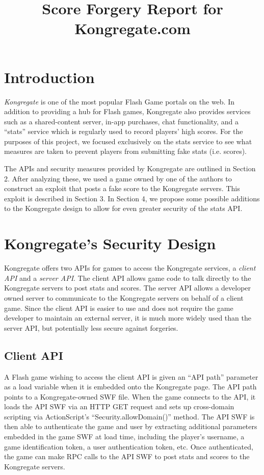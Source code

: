 \documentclass [11pt] {article}
\begin{document}
\title { Score Forgery Report for Kongregate.com}

\maketitle

\section { Introduction }

\emph{Kongregate} is one of the most popular Flash Game portals on the web. In addition to providing a hub for Flash games, Kongregate also provides services such as a shared-content server, in-app purchases, chat functionality, and a ``stats'' service which is regularly used to record players' high scores. For the purposes of this project, we focused exclusively on the stats service to see what measures are taken to prevent players from submitting fake stats (i.e. scores). 

The APIs and security measures provided by Kongregate are outlined in Section 2. After analyzing these, we used a game owned by one of the authors to construct an exploit that posts a fake score to the Kongregate servers. This exploit is described in Section 3. In Section 4, we propose some possible additions to the Kongregate design to allow for even greater security of the stats API. 

\section { Kongregate's Security Design }

Kongregate offers two APIs for games to access the Kongregate services, a \emph{client API} and a \emph{server API}. The client API allows game code to talk directly to the Kongregate servers to post stats and scores. The server API allows a developer owned server to communicate to the Kongregate servers on behalf of a client game. Since the client API is easier to use and does not require the game developer to maintain an external server, it is much more widely used than the server API, but potentially less secure against forgeries. 

\subsection {Client API}

A Flash game wishing to access the client API is given an ``API path'' parameter as a load variable when it is embedded onto the Kongregate page. The API path points to a Kongregate-owned SWF file. When the game connects to the API, it loads the API SWF via an HTTP GET request and sets up cross-domain scripting via ActionScript's ``Security.allowDomain()'' method. The API SWF is then able to authenticate the game and user by extracting additional parameters embedded in the game SWF at load time, including the player's username, a game identification token, a user authentication token, etc. Once authenticated, the game can make RPC calls to the API SWF to post stats and scores to the Kongregate servers. 
\end{document}
